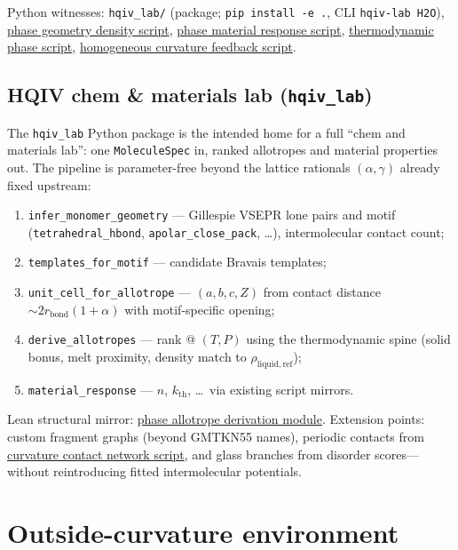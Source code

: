 \documentclass[11pt,notitlepage]{amsart}
\begin{document}
Python witnesses:
\texttt{hqiv\_lab/} (package; \texttt{pip install -e .}, CLI \texttt{hqiv-lab H2O}),
\hyperref[app:scripts]{phase geometry density script},
\hyperref[app:scripts]{phase material response script},
\hyperref[app:scripts]{thermodynamic phase script},
\hyperref[app:scripts]{homogeneous curvature feedback script}.

\subsection[HQIV chem and materials lab]{\texorpdfstring{HQIV chem \& materials lab (\texttt{hqiv\_lab})}{HQIV chem and materials lab (hqiv\_lab)}}
\label{sec:hqiv-lab}

The \texttt{hqiv\_lab} Python package is the intended home for a full ``chem and
materials lab'': one \texttt{MoleculeSpec} in, ranked allotropes and material
properties out. The pipeline is parameter-free beyond the lattice rationals
$(\alpha,\gamma)$ already fixed upstream:
\begin{enumerate}[leftmargin=2em]
\item \texttt{infer\_monomer\_geometry} --- Gillespie VSEPR lone pairs and motif
  \cite{gillespie1970vsepr} (\texttt{tetrahedral\_hbond},
  \texttt{apolar\_close\_pack}, \ldots), intermolecular contact count;
\item \texttt{templates\_for\_motif} --- candidate Bravais templates;
\item \texttt{unit\_cell\_for\_allotrope} --- $(a,b,c,Z)$ from contact distance
  $\sim 2 r_{\mathrm{bond}}(1+\alpha)$ with motif-specific opening;
\item \texttt{derive\_allotropes} --- rank @ $(T,P)$ using the thermodynamic spine
  (solid bonus, melt proximity, density match to $\rho_{\mathrm{liquid,ref}}$);
\item \texttt{material\_response} --- $n$, $k_{\mathrm{th}}$, \ldots\ via existing
  script mirrors.
\end{enumerate}

Lean structural mirror:
\hyperref[lean:phase-allotrope-derivation]{phase allotrope derivation module}.
Extension points: custom fragment graphs (beyond GMTKN55 names), periodic contacts
from \hyperref[app:scripts]{curvature contact network script}, and glass branches from
disorder scores---without reintroducing fitted intermolecular potentials.

\section{Outside-curvature environment}
\label{sec:outside}
\end{document}
